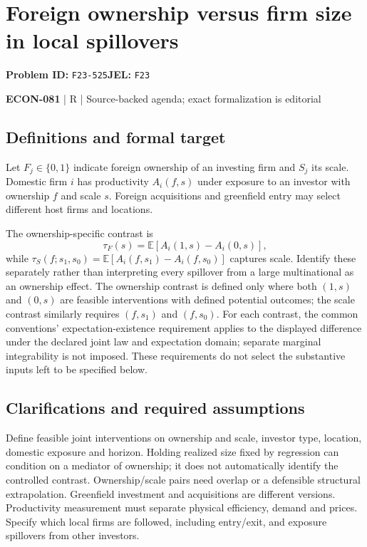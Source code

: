 \documentclass[11pt,a4paper]{article}
\begin{document}
\section*{Foreign ownership versus firm size in local spillovers}
\textbf{Problem ID:} \texttt{F23-525}\quad \textbf{JEL:} \texttt{F23}\par
\label{problem:OP-0644}


\label{audited:ECON-081}

{\sffamily\small\color{muted}\textbf{ECON-081} | R | Source-backed agenda; exact formalization is editorial\par}

\subsection*{Definitions and formal target}

Let $F_j\in\{0,1\}$ indicate foreign ownership of an investing firm and $S_j$ its scale. Domestic firm $i$ has productivity $A_i(f,s)$ under exposure to an investor with ownership $f$ and scale $s$. Foreign acquisitions and greenfield entry may select different host firms and locations.

The ownership-specific contrast is
\[
 \tau_F(s)=\mathbb E[A_i(1,s)-A_i(0,s)],
\]
while $\tau_S(f;s_1,s_0)=\mathbb E[A_i(f,s_1)-A_i(f,s_0)]$ captures scale. Identify these separately rather than interpreting every spillover from a large multinational as an ownership effect. The ownership contrast is defined only where both $(1,s)$ and $(0,s)$ are feasible interventions with defined potential outcomes; the scale contrast similarly requires $(f,s_1)$ and $(f,s_0)$. For each contrast, the common conventions' expectation-existence requirement applies to the displayed difference under the declared joint law and expectation domain; separate marginal integrability is not imposed. These requirements do not select the substantive inputs left to be specified below.

\subsection*{Clarifications and required assumptions}

Define feasible joint interventions on ownership and scale, investor type, location, domestic exposure and horizon. Holding realized size fixed by regression can condition on a mediator of ownership; it does not automatically identify the controlled contrast. Ownership/scale pairs need overlap or a defensible structural extrapolation. Greenfield investment and acquisitions are different versions. Productivity measurement must separate physical efficiency, demand and prices. Specify which local firms are followed, including entry/exit, and exposure spillovers from other investors.
\end{document}
